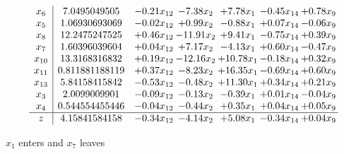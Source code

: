 \documentclass[9pt]{article}
\begin{document}
 \[\begin{array}{c| c c@{\hskip 2pt} c@{\hskip 2pt} c@{\hskip 2pt} c@{\hskip 2pt} c@{\hskip 2pt} }
 x_{6}   &  7.0495049505 & -0.21 x_{12} & -7.38 x_{2} & +  7.78 x_{1} & -0.45 x_{14} & +  0.78 x_{9}\\
 x_{5}   &  1.06930693069 & -0.02 x_{12} & +  0.99 x_{2} & -0.88 x_{1} & +  0.07 x_{14} & -0.06 x_{9}\\
 x_{8}   &  12.2475247525 & +  0.46 x_{12} & -11.91 x_{2} & +  9.41 x_{1} & -0.75 x_{14} & +  0.39 x_{9}\\
 x_{7}   &  1.60396039604 & +  0.04 x_{12} & +  7.17 x_{2} & -4.13 x_{1} & +  0.60 x_{14} & -0.47 x_{9}\\
 x_{10}   &  13.3168316832 & +  0.19 x_{12} & -12.16 x_{2} & + 10.78 x_{1} & -0.18 x_{14} & +  0.32 x_{9}\\
 x_{11}   &  0.811881188119 & +  0.37 x_{12} & -8.23 x_{2} & + 16.35 x_{1} & -0.69 x_{14} & +  0.60 x_{9}\\
 x_{13}   &  5.84158415842 & -0.53 x_{12} & -0.48 x_{2} & + 11.30 x_{1} & +  0.34 x_{14} & +  0.21 x_{9}\\
 x_{3}   &  2.0099009901 & -0.09 x_{12} & -0.13 x_{2} & -0.39 x_{1} & +  0.01 x_{14} & -0.04 x_{9}\\
 x_{4}   &  0.544554455446 & -0.04 x_{12} & -0.44 x_{2} & +  0.35 x_{1} & +  0.04 x_{14} & +  0.05 x_{9}\\
\hline
z    &  4.15841584158 & -0.34 x_{12} & -4.14 x_{2} & +  5.08 x_{1} & -0.34 x_{14} & +  0.04 x_{9}\\
\end{array}\]


 $ x_{1} $ enters and $ x_{7} $ leaves 
\end{document}
